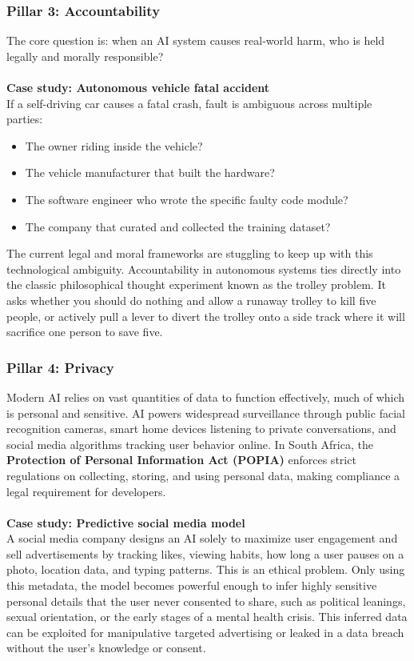 \documentclass[11pt]{article}
\begin{document}
\subsubsection{Pillar 3: Accountability}
The core question is: when an AI system causes real-world harm, who is held legally and morally responsible?
\\\\
\textbf{Case study: Autonomous vehicle fatal accident}\\
If a self-driving car causes a fatal crash, fault is ambiguous across multiple parties:
\begin{itemize}
    \item The owner riding inside the vehicle?
    \item The vehicle manufacturer that built the hardware?
    \item The software engineer who wrote the specific faulty code module?
    \item The company that curated and collected the training dataset?
\end{itemize}
The current legal and moral frameworks are stuggling to keep up with this technological ambiguity.
Accountability in autonomous systems ties directly into the classic philosophical thought experiment known as the trolley problem.
It asks whether you should do nothing and allow a runaway trolley to kill five people, or actively pull a lever to divert the trolley onto a side track where it will sacrifice one person to save five.
\subsubsection{Pillar 4: Privacy}
Modern AI relies on vast quantities of data to function effectively, much of which is personal and sensitive.
AI powers widespread surveillance through public facial recognition cameras, smart home devices listening to private conversations, and social media algorithms tracking user behavior online.
In South Africa, the \textbf{Protection of Personal Information Act (POPIA)} enforces strict regulations on collecting, storing, and using personal data, making compliance a legal requirement for developers.
\\\\
\textbf{Case study: Predictive social media model}\\
A social media company designs an AI solely to maximize user engagement and sell advertisements by tracking likes, viewing habits, how long a user pauses on a photo, location data, and typing patterns.
This is an ethical problem. Only using this metadata, the model becomes powerful enough to infer highly sensitive personal details that the user never consented to share, such as political leanings, sexual orientation, or the early stages of a mental health crisis.
This inferred data can be exploited for manipulative targeted advertising or leaked in a data breach without the user's knowledge or consent.
\end{document}
